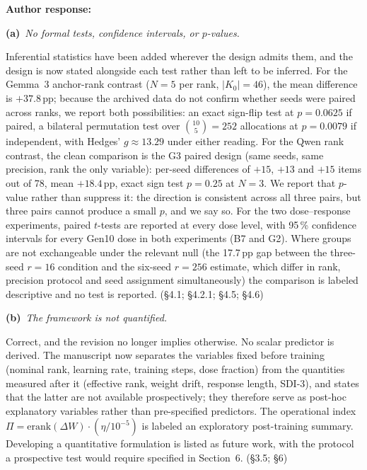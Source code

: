 \documentclass[11pt,a4paper]{article}
\newcommand{\newtext}[1]{#1}
\newcommand{\rsub}[2]{%
  \medskip\noindent\textbf{#1}~\textit{#2}\par\smallskip%
}
\newcommand{\arhead}[1]{\medskip\noindent\textbf{#1}\par\smallskip}
\newcommand{\newtext}[1]{\textcolor{chgcolor}{``#1''}}
\begin{document}
\arhead{Author response:}

\rsub{(a)}{No formal tests, confidence intervals, or $p$-values.}
Inferential statistics have been added wherever the design admits them,
and the design is now stated alongside each test rather than left to be
inferred. For the Gemma~3 anchor-rank contrast ($N=5$ per rank,
$|K_0|=46$), the mean difference is $+37.8$\,pp; because the
archived data do not confirm whether seeds were paired across ranks, we
report both possibilities: an exact sign-flip test at $p=0.0625$ if
paired, a bilateral permutation test over $\binom{10}{5}=252$ allocations
at $p=0.0079$ if independent, with Hedges' $g \approx 13.29$ under
either reading. For the Qwen rank contrast, the clean comparison is the
G3 paired design (same seeds, same precision, rank the only variable):
per-seed differences of $+15$, $+13$ and $+15$ items out of 78, mean
$+18.4$\,pp, exact sign test $p=0.25$ at $N=3$. We report that $p$-value
rather than suppress it: the direction is consistent across all three
pairs, but three pairs cannot produce a small $p$, and we say so. For the
two dose--response experiments, paired $t$-tests are reported at every
dose level, with 95\,\% confidence intervals for every Gen10 dose in
both experiments (B7 and G2). Where groups are not
exchangeable under the relevant null (the 17.7\,pp gap between the
three-seed $r=16$ condition and the six-seed $r=256$ estimate, which
differ in rank, precision protocol and seed assignment simultaneously)
the comparison is labeled descriptive and no test is reported.
\newtext{(\S4.1; \S4.2.1; \S4.5; \S4.6)}

\rsub{(b)}{The framework is not quantified.}
Correct, and the revision no longer implies otherwise. No scalar
predictor is derived. The manuscript now separates the variables fixed
before training (nominal rank, learning rate, training steps, dose
fraction) from the quantities measured after it (effective rank,
weight drift, response length, SDI-3), and states that the latter
\newtext{are not available prospectively; they therefore serve as
post-hoc explanatory variables rather than pre-specified predictors}. The
operational index $\Pi = \mathrm{erank}(\Delta W)\cdot(\eta/10^{-5})$ is
labeled \newtext{an exploratory post-training summary}. Developing a
quantitative formulation is listed as future work, with the protocol a
prospective test would require specified in Section~6.
\newtext{(\S3.5; \S6)}
\end{document}
